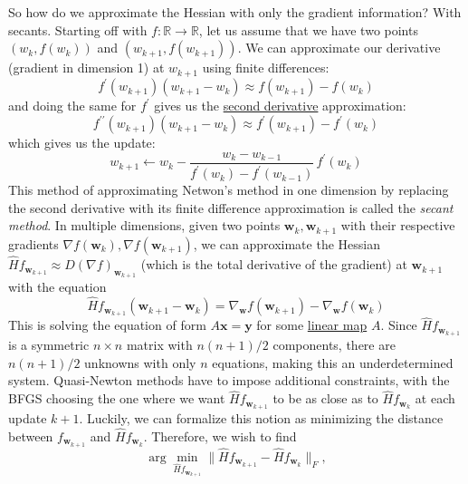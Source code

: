   So how do we approximate the Hessian with only the gradient information? With secants. Starting off with $f: \mathbb{R} \to \mathbb{R}$, let us assume that we have two points $(w_k, f(w_k))$ and $(w_{k+1}, f(w_{k+1}))$. We can approximate our derivative (gradient in dimension 1) at $w_{k+1}$ using finite differences: 
  \begin{equation}
    f^\prime (w_{k+1}) (w_{k+1} - w_k) \approx f(w_{k+1}) - f(w_k)
  \end{equation}
  and doing the same for $f^\prime$ gives us the \hyperref[mv-def:second-derivative]{second derivative} approximation: 
  \begin{equation}
    f^{\prime\prime} (w_{k+1}) (w_{k+1} - w_k) \approx f^\prime (w_{k+1}) - f^\prime (w_k)
  \end{equation}
  which gives us the update: 
  \begin{equation}
    w_{k+1} \gets w_k - \frac{w_{k} - w_{k-1}}{f^\prime (w_k) - f^\prime (w_{k-1})} \, f^\prime (w_k)
  \end{equation}
  This method of approximating Netwon's method in one dimension by replacing the second derivative with its finite difference approximation is called the \textit{secant method}. In multiple dimensions, given two points $\mathbf{w}_k, \mathbf{w}_{k+1}$ with their respective gradients $\nabla f (\mathbf{w}_{k}), \nabla f (\mathbf{w}_{k+1})$, we can approximate the Hessian $\hat{H} f_{\mathbf{w}_{k+1}} \approx D (\nabla f)_{\mathbf{w}_{k+1}}$ (which is the total derivative of the gradient) at $\mathbf{w}_{k+1}$ with the equation
  \begin{equation}
    \hat{H} f_{\mathbf{w}_{k+1}} (\mathbf{w}_{k+1} - \mathbf{w}_k) = \nabla_\mathbf{w} f (\mathbf{w}_{k+1}) - \nabla_\mathbf{w} f (\mathbf{w}_k)
  \end{equation}
  This is solving the equation of form $A \mathbf{x} = \mathbf{y}$ for some \hyperref[lin-def:linear_map]{linear map} $A$. Since $\hat{H} f_{\mathbf{w}_{k+1}}$ is a symmetric $n \times n$ matrix with $n (n+1) / 2$ components, there are $n (n+1) / 2$ unknowns with only $n$ equations, making this an underdetermined system. Quasi-Newton methods have to impose additional constraints, with the BFGS choosing the one where we want $\hat{H} f_{\mathbf{w}_{k+1}}$ to be as close as to $\hat{H} f_{\mathbf{w}_{k}}$ at each update $k+1$. Luckily, we can formalize this notion as minimizing the distance between $f_{\mathbf{w}_{k+1}}$ and $\hat{H} f_{\mathbf{w}_{k}}$. Therefore, we wish to find 
  \begin{equation}
    \arg \min_{\hat{H} f_{\mathbf{w}_{k+1}}} \|\hat{H} f_{\mathbf{w}_{k+1}} - \hat{H} f_{\mathbf{w}_{k}}\|_F,
  \end{equation}
